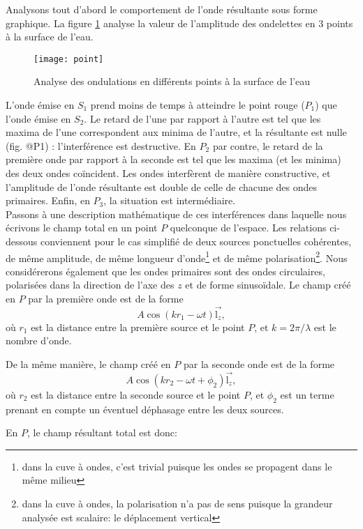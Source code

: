 Analysons tout d'abord le comportement de l'onde résultante sous forme graphique. La figure \ref{point} analyse la valeur de l'amplitude des ondelettes en 3 points à la surface de l'eau.

\begin{figure}[htb]
\centering
\texttt{[image: point]}
\caption{Analyse des ondulations en différents points à la surface de l'eau}
\label{point}
\end{figure}

L'onde émise en $S_1$ prend moins de temps à atteindre le point rouge ($P_1$) que l'onde émise en $S_2$. Le retard de l'une par rapport à l'autre est tel que les maxima de l'une correspondent aux minima de l'autre, et la résultante est nulle (fig. @P1) : l'interférence est destructive. En $P_2$ par contre, le retard de la première onde par rapport à la seconde est tel que les maxima (et les minima) des deux ondes coïncident. Les ondes interfèrent de manière constructive, et l'amplitude de l'onde résultante est double de celle de chacune des ondes primaires. Enfin, en $P_3$, la situation est intermédiaire.\\

Passons à une description mathématique de ces interférences dans laquelle nous écrivons le champ total en un point $P$ quelconque de l'espace. Les relations ci-dessous conviennent pour le cas simplifié de deux sources ponctuelles cohérentes, de même amplitude, de même longueur d'onde\footnote{dans la cuve à ondes, c'est trivial puisque les ondes se propagent dans le même milieu} et de même polarisation\footnote{dans la cuve à ondes, la polarisation n'a pas de sens puisque la grandeur analysée est scalaire: le déplacement vertical}. Nous considérerons également que les ondes primaires sont des ondes circulaires, polarisées dans la direction de l'axe des $z$ et de forme sinusoïdale.
Le champ créé en $P$ par la première onde est de la forme 
$$A \cos (kr_1-\omega t)\overset\rightarrow{\mbox{l}_z},$$
où $r_1$ est la distance entre la première source et le point $P$, et $k=2\pi/\lambda$ est le nombre d'onde. 

De la même manière, le champ créé en $P$ par la seconde onde est de la forme 
$$A \cos (kr_2-\omega t +\phi_2)\overset\rightarrow{\mbox{l}_z},$$
où $r_2$ est la distance entre la seconde source et le point $P$, et $\phi_2$ est un terme prenant en compte un éventuel déphasage entre les deux sources. 

En $P$, le champ résultant total est donc:

